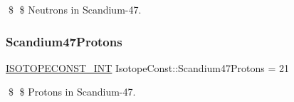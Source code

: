 \$ \$ Neutrons in Scandium-\/47. \mbox{\label{group___isotope_const-_scandium-_sc47_gafb0a783ecab2e200f73aa9cd0259e9e2}} 
\subsubsection{\texorpdfstring{Scandium47\+Protons}{Scandium47Protons}}
{\footnotesize\ttfamily \mbox{\hyperlink{group___isotope_const-_macros_ga5f18360b3e99483a35c32d789e62621c}{I\+S\+O\+T\+O\+P\+E\+C\+O\+N\+S\+T\+\_\+\+I\+NT}} Isotope\+Const\+::\+Scandium47\+Protons = 21}

\$ \$ Protons in Scandium-\/47. 